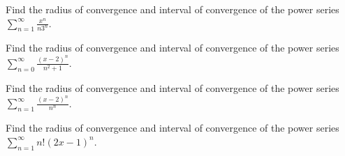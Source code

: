\documentclass[
  course = {{MATH102 Calculus II}},
  quartile = {{2}},
  assignment = {{Sections 11.8}},%
  topic = {{Power Series}},
  firstexercise = 1,
  term = 203
]{../class/aga-homework}
\begin{document}
\newpage

\problem Find the radius of convergence and interval of convergence of the power series $\displaystyle \sum_{n=1}^{\infty}\frac{x^{n}}{n3^n}$.

\newpage

\problem Find the radius of convergence and interval of convergence of the power series $\displaystyle \sum_{n=0}^{\infty}\frac{(x-2)^{n}}{n^2+1}$.

\newpage

\problem Find the radius of convergence and interval of convergence of the power series $\displaystyle \sum_{n=1}^{\infty}\frac{(x-2)^{n}}{n^n}$.

\newpage

\problem Find the radius of convergence and interval of convergence of the power series $\displaystyle \sum_{n=1}^{\infty}n!(2x-1)^n $.


\newpage
\afterpage{\null\newpage}

\afterpage{\null\newpage}

\afterpage{\null\newpage}
\end{document}
